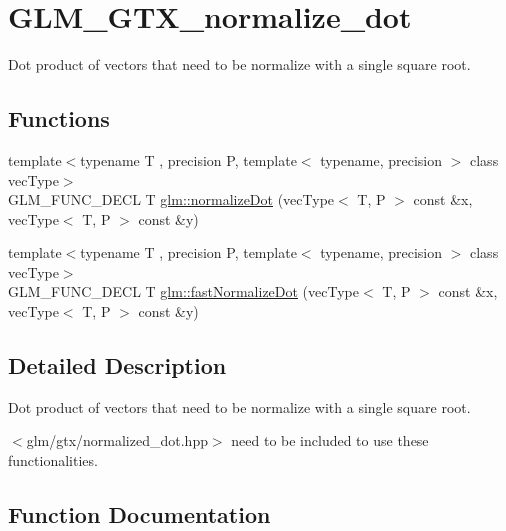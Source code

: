 \hypertarget{group__gtx__normalize__dot}{}\section{G\+L\+M\+\_\+\+G\+T\+X\+\_\+normalize\+\_\+dot}
\label{group__gtx__normalize__dot}


Dot product of vectors that need to be normalize with a single square root.  


\subsection*{Functions}
\begin{DoxyCompactItemize}
\item 
{\footnotesize template$<$typename T , precision P, template$<$ typename, precision $>$ class vec\+Type$>$ }\\G\+L\+M\+\_\+\+F\+U\+N\+C\+\_\+\+D\+E\+CL T \hyperlink{group__gtx__normalize__dot_gaffbc2f2cb15838de8886a68048f9004d}{glm\+::normalize\+Dot} (vec\+Type$<$ T, P $>$ const \&x, vec\+Type$<$ T, P $>$ const \&y)
\item 
{\footnotesize template$<$typename T , precision P, template$<$ typename, precision $>$ class vec\+Type$>$ }\\G\+L\+M\+\_\+\+F\+U\+N\+C\+\_\+\+D\+E\+CL T \hyperlink{group__gtx__normalize__dot_ga8593b21bc2fe22184f01d5e08b5a2024}{glm\+::fast\+Normalize\+Dot} (vec\+Type$<$ T, P $>$ const \&x, vec\+Type$<$ T, P $>$ const \&y)
\end{DoxyCompactItemize}


\subsection{Detailed Description}
Dot product of vectors that need to be normalize with a single square root. 

$<$glm/gtx/normalized\+\_\+dot.\+hpp$>$ need to be included to use these functionalities. 

\subsection{Function Documentation}
\mbox{\label{group__gtx__normalize__dot_ga8593b21bc2fe22184f01d5e08b5a2024}} 
